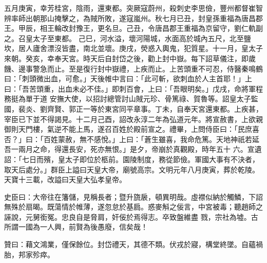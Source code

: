 \begin{pinyinscope}
 五月庚寅，幸芳桂宮，陰雨，還東都。突厥寇蔚州，殺刺史李思儉，豐州都督崔智辨率師出朝那山掩擊之，為賊所敗，遂寇嵐州。秋七月已丑，封皇孫重福為唐昌郡王。甲辰，相王輪改封豫王，更名旦。己丑，令唐昌郡王重福為京留守，劉仁軌副之。召皇太子至東都。
 己巳，河水溢，壞河陽城，水面高於城內五尺，北至鹽坎，居人廬舍漂沒皆盡，南北並壞。庚戌，熒惑入輿鬼，犯質星。十一月，皇太子來朝。癸亥，幸奉天宮。時天后自封岱之後，勸上封中嶽。每下詔草儀注，即歲饑、邊事警急而止。至是復行封中嶽禮，上疾而止。上苦頭重不可忍，侍醫秦鳴鶴曰：「刺頭微出血，可愈。」天後帷中言曰：「此可斬，欲刺血於人主首耶！」上曰：「吾苦頭重，出血未必不佳。」即刺百會，上曰：「吾眼明矣。」戊戌，命將軍程務挺為單于道
 安撫大使，以招討總管討山賊元珍、骨篤祿、賀魯等。詔皇太子監國，裴炎、劉齊賢、郭正一等於東宮同平章事。丁未，自奉天宮還東都。上疾甚，宰臣已下並不得謁見。十二月己酉，詔改永淳二年為弘道元年。將宣赦書，上欲親御則天門樓，氣逆不能上馬，遂召百姓於殿前宣之。禮畢，上問侍臣曰：「民庶喜否？」曰：「百姓蒙赦，無不感悅。」上曰：「蒼生雖喜，我命危篤。天地神祇若延吾一兩月之命，得還長安，死亦無恨。」是夕，帝崩於真觀殿，時年五十
 六。宣遺詔：「七日而殯，皇太子即位於柩前。園陵制度，務從節儉。軍國大事有不決者，取天后處分。」群臣上謚曰天皇大帝，廟號高宗。文明元年八月庚寅，葬於乾陵。天寶十三載，改謚曰天皇大弘孝皇帝。



 史臣曰：大帝往在籓儲，見稱長者；暨升旒扆，頓異明哉。虛襟似納於觸鱗，下詔無殊於扇暍。既蕩情於帷薄，遂忽怠於基扃。惑麥斛之佞言，中宮被毒；聽趙師之誣說，元舅銜冤。忠良自是脅肩，奸佞於焉得志。卒致盤維盡
 戮，宗社為墟。古所謂一國為一人興，前賢為後愚廢，信矣哉！



 贊曰：藉文鴻業，僅保餘位。封岱禮天，其德不類。伏戎於寢，構堂終墜。自蘊禍胎，邦家殄瘁。



\end{pinyinscope}